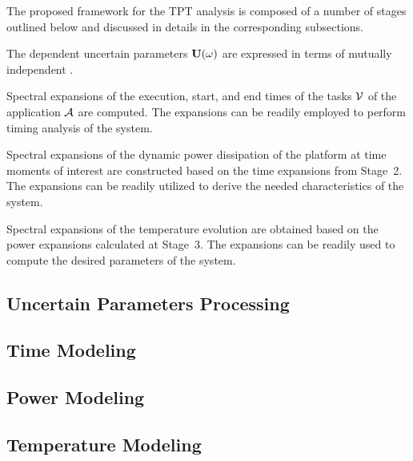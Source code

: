 The proposed framework for the TPT analysis is composed of a number of stages outlined below and discussed in details in the corresponding subsections.

 The dependent uncertain parameters $\mathbf{U}(\omega)$ are expressed in terms of mutually independent \rvs.

 Spectral expansions of the execution, start, and end times of the tasks $\mathcal{V}$ of the application $\mathcal{A}$ are computed. The expansions can be readily employed to perform timing analysis of the system.

 Spectral expansions of the dynamic power dissipation of the platform at time moments of interest are constructed based on the time expansions from Stage~2. The expansions can be readily utilized to derive the needed characteristics of the system.

 Spectral expansions of the temperature evolution are obtained based on the power expansions calculated at Stage~3. The expansions can be readily used to compute the desired parameters of the system.

\subsection{Uncertain Parameters Processing} 


\subsection{Time Modeling} 


\subsection{Power Modeling} 


\subsection{Temperature Modeling} 

